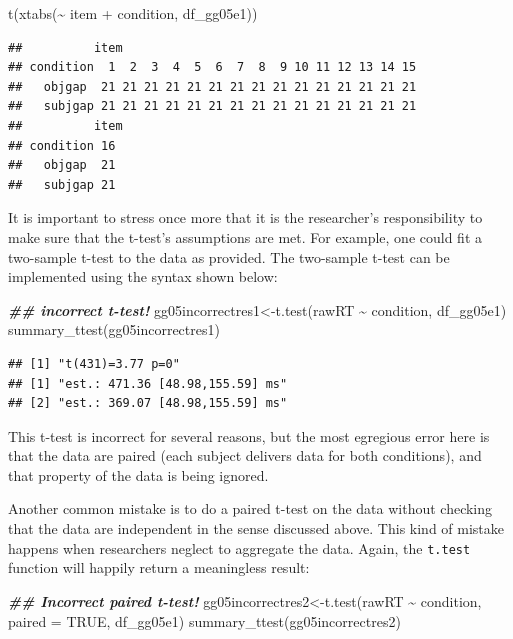 \documentclass[
  12pt,
]{krantz}
\newenvironment{Shaded}{\begin{snugshade}}{\end{snugshade}}
\newcommand{\AttributeTok}[1]{\textcolor[rgb]{0.77,0.63,0.00}{#1}}
\newcommand{\ConstantTok}[1]{\textcolor[rgb]{0.00,0.00,0.00}{#1}}
\newcommand{\DocumentationTok}[1]{\textcolor[rgb]{0.56,0.35,0.01}{\textbf{\textit{#1}}}}
\newcommand{\FunctionTok}[1]{\textcolor[rgb]{0.00,0.00,0.00}{#1}}
\newcommand{\NormalTok}[1]{#1}
\newcommand{\OtherTok}[1]{\textcolor[rgb]{0.56,0.35,0.01}{#1}}
\newcommand{\SpecialCharTok}[1]{\textcolor[rgb]{0.00,0.00,0.00}{#1}}
\theoremstyle{definition}
\theoremstyle{definition}
\theoremstyle{definition}
\theoremstyle{definition}
\theoremstyle{remark}
\begin{document}
\begin{Shaded}
\begin{Highlighting}[]
\FunctionTok{t}\NormalTok{(}\FunctionTok{xtabs}\NormalTok{(}\SpecialCharTok{\textasciitilde{}}\NormalTok{ item }\SpecialCharTok{+}\NormalTok{ condition, df\_gg05e1))}
\end{Highlighting}
\end{Shaded}

\begin{verbatim}
##          item
## condition  1  2  3  4  5  6  7  8  9 10 11 12 13 14 15
##   objgap  21 21 21 21 21 21 21 21 21 21 21 21 21 21 21
##   subjgap 21 21 21 21 21 21 21 21 21 21 21 21 21 21 21
##          item
## condition 16
##   objgap  21
##   subjgap 21
\end{verbatim}

It is important to stress once more that it is the researcher's responsibility to make sure that the t-test's assumptions are met. For example, one could fit a two-sample t-test to the data as provided. The two-sample t-test can be implemented using the syntax shown below:

\begin{Shaded}
\begin{Highlighting}[]
\DocumentationTok{\#\# incorrect t{-}test!}
\NormalTok{gg05incorrectres1}\OtherTok{\textless{}{-}}\FunctionTok{t.test}\NormalTok{(rawRT }\SpecialCharTok{\textasciitilde{}}\NormalTok{ condition, df\_gg05e1)}
\FunctionTok{summary\_ttest}\NormalTok{(gg05incorrectres1)}
\end{Highlighting}
\end{Shaded}

\begin{verbatim}
## [1] "t(431)=3.77 p=0"
## [1] "est.: 471.36 [48.98,155.59] ms"
## [2] "est.: 369.07 [48.98,155.59] ms"
\end{verbatim}

This t-test is incorrect for several reasons, but the most egregious error here is that the data are paired (each subject delivers data for both conditions), and that property of the data is being ignored.

Another common mistake is to do a paired t-test on the data without checking that the data are independent in the sense discussed above. This kind of mistake happens when researchers neglect to aggregate the data. Again, the \texttt{t.test} function will happily return a meaningless result:

\begin{Shaded}
\begin{Highlighting}[]
\DocumentationTok{\#\# Incorrect paired t{-}test!}
\NormalTok{gg05incorrectres2}\OtherTok{\textless{}{-}}\FunctionTok{t.test}\NormalTok{(rawRT }\SpecialCharTok{\textasciitilde{}}\NormalTok{ condition, }
                          \AttributeTok{paired =} \ConstantTok{TRUE}\NormalTok{, df\_gg05e1)}
\FunctionTok{summary\_ttest}\NormalTok{(gg05incorrectres2)}
\end{Highlighting}
\end{Shaded}
\end{document}
